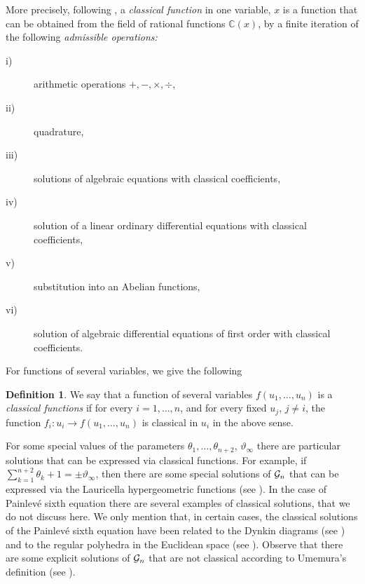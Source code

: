 \documentclass[12pt]{article}
\def\thi{{\vartheta_\infty}}
\newcommand{\complessi}{\mathbb C}
\theoremstyle{definition}
\newtheorem{df}{Definition}
\theoremstyle{theorem}
\begin{document}
More precisely, following \cite{Um,Um1,Um2}, a {\it classical 
function}\/ in one variable, $x$ is a function that can be obtained 
from the field of rational functions $\complessi(x)$, by a finite 
iteration of the following {\it admissible operations:}\/
\begin{description}
\item[i)] arithmetic operations $+,-,\times,\div$, 
\item[ii)] quadrature,
\item[iii)] solutions of algebraic equations with classical 
coefficients,
\item[iv)] solution of a linear ordinary differential equations 
with classical coefficients,
\item[v)] substitution into an Abelian functions,
\item[vi)] solution of algebraic differential equations of first 
order with classical coefficients.
\end{description}

For functions of several variables, we give the following

\begin{df}
We say that a function of several variables $f(u_1,\dots,u_n)$
is a {\it classical functions}\/ if for every 
$i=1,\dots,n$, and for every fixed $u_j$, $j\neq i$, the function
$f_i:u_i\to f(u_1,\dots,u_n)$ is classical in $u_i$ in the above sense. 
\label{classic}\end{df}

For some special values of the parameters 
$\theta_1,\dots,\theta_{n+2}$, $\thi$ there are particular solutions 
that can be expressed via classical functions. For example, if 
$\sum_{k=1}^{n+2}\theta_k+1=\pm\thi$, then there are some special
solutions of ${\cal G}_n$ that can be expressed via the Lauricella
hypergeometric functions (see \cite{OK}). In the case of Painlev\'e
sixth equation there are several examples of classical solutions, that
we do not discuss here. We only mention that, in certain cases, the
classical solutions of the Painlev\'e sixth equation have been related 
to the Dynkin diagrams (see \cite{Ok2}) and to the regular polyhedra 
in the Euclidean space (see \cite{DM,M,Hit}). 
Observe that there are some explicit solutions of ${\cal G}_n$ that
are not classical according to Umemura's definition (see 
\cite{Pic,Hit1,KK,DIKZ}). 
\end{document}
